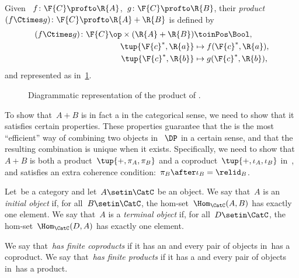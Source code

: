 \begin{definition}
    \label{def:product-dp}
    Given ~$f\colon \F{C} \profto \R{A}$,~$g \colon \F{C} \profto \R{B}$, their \emph{product}~$(f \Ctimes g)\colon \F{C} \profto \R{A} + \R{B}$ is defined by
    \begin{equation}
        \begin{aligned}
            (f \Ctimes g)
            \colon \F{C}\op \times (\R{A} + \R{B}) & \toinPos \Bool, \\
            \tup{\F{c}^*, \R{a}}                   & \mapsto f(\F{c}^*, \R{a}), \\
            \tup{\F{c}^*, \R{b}}                   & \mapsto g(\F{c}^*, \R{b}),
        \end{aligned}
    \end{equation}
    and represented as in~\cref{fig:productdp}.
\end{definition}

\begin{figure}[h!]
    \centering
    \caption{Diagrammatic representation of the product of . }
    \label{fig:productdp}
\end{figure}

To show that~$A + B$ is in fact a  in the categorical sense, we need to show that it satisfies certain properties.
These properties guarantee that the  is the most ``efficient'' way of combining two objects in~$~\DP$ in a certain sense, and that the resulting combination is unique when it exists.
Specifically, we need to show that~$A + B$ is both a product~$\tup{+, \pi_A, \pi_B}$ and a coproduct~$\tup{+, \iota_A, \iota_B}$ in~\DP, and satisfies an extra coherence condition:~$\pi_B \after \iota_B = \relid_B$.

\begin{ctdefinition}
    \label{def:initial-terminal-object}
    Let~\CatC be a category and let~$A \setin \CatC$ be an object.
    We say that~$A$ is an \emph{initial object} if, for all~$B \setin\CatC$, the hom-set~$\Hom_{\CatC}(A,B)$ has exactly one element.
    We say that~$A$ is a \emph{terminal object} if, for all~$D\setin\CatC$, the hom-set~$\Hom_{\CatC}(D,A)$ has exactly one element.
\end{ctdefinition}

\begin{ctdefinition}
    \label{def:finite-products}
    We say that~\CatC \emph{has finite coproducts} if it has an  and every pair of objects in~\CatC has a coproduct.
    We say that~\CatC \emph{has finite products} if it has a  and every pair of objects in~\CatC has a product.
\end{ctdefinition}


